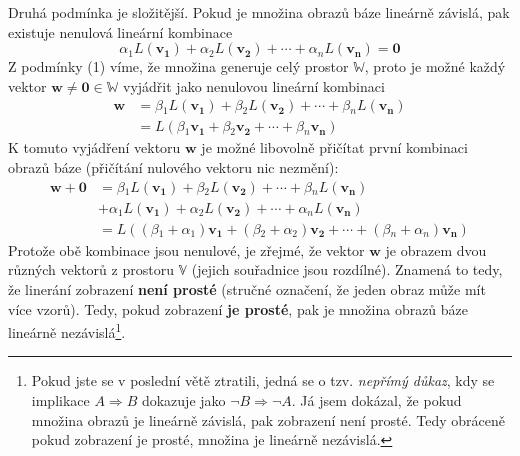 \documentclass[a5paper,12pt]{amsbook}
\theoremstyle{definition}
\newcommand{\myscalar}[1]{#1}
\newcommand{\myvec}[1]{\mathbf{#1}}
\newcommand{\myspace}[1]{\mathbb{#1}}
\newcommand{\mymap}[1]{#1}
\begin{document}
Druhá podmínka je složitější. Pokud je množina obrazů báze lineárně závislá, pak existuje
nenulová lineární kombinace
\begin{equation*}
\myscalar{\alpha{}_1}\mymap{L}(\myvec{v_1}) + \myscalar{\alpha{}_2}\mymap{L}(\myvec{v_2}) 
  + \cdots + \myscalar{\alpha{}_n}\mymap{L}(\myvec{v_n}) = \myvec{0}
\end{equation*}
 Z podmínky (1) víme, že množina generuje celý prostor $\myspace{W}$, proto je
možné každý vektor $\myvec{w}\neq\myvec{0}\in\myspace{W}$ vyjádřit jako nenulovou lineární kombinaci
\begin{equation*}
\begin{split}
\myvec{w} &= \myscalar{\beta{}_1}\mymap{L}(\myvec{v_1}) + \myscalar{\beta{}_2}\mymap{L}(\myvec{v_2}) 
  + \cdots + \myscalar{\beta{}_n}\mymap{L}(\myvec{v_n}) \\
&= \mymap{L}(\myscalar{\beta{}_1}\myvec{v_1} + \myscalar{\beta{}_2}\myvec{v_2} 
  + \cdots + \myscalar{\beta{}_n}\myvec{v_n})
\end{split}
\end{equation*}
K tomuto vyjádření vektoru $\myvec{w}$ je možné libovolně přičítat první kombinaci obrazů báze
(přičítání nulového vektoru nic nezmění):
\begin{equation*}
\begin{split}
\myvec{w} + \myvec{0} &= \myscalar{\beta{}_1}\mymap{L}(\myvec{v_1}) 
  + \myscalar{\beta{}_2}\mymap{L}(\myvec{v_2}) + \cdots + \myscalar{\beta{}_n}\mymap{L}(\myvec{v_n}) \\
  &+ \myscalar{\alpha{}_1}\mymap{L}(\myvec{v_1}) + \myscalar{\alpha{}_2}\mymap{L}(\myvec{v_2}) 
  + \cdots + \myscalar{\alpha{}_n}\mymap{L}(\myvec{v_n}) \\
&= \mymap{L}((\myscalar{\beta{}_1} + \myscalar{\alpha{}_1})\myvec{v_1} 
  + (\myscalar{\beta{}_2} + \myscalar{\alpha{}_2})\myvec{v_2} 
  + \cdots + (\myscalar{\beta{}_n} + \myscalar{\alpha{}_n})\myvec{v_n})
\end{split}
\end{equation*}
Protože obě kombinace jsou nenulové, je zřejmé, že vektor $\myvec{w}$ je obrazem dvou různých
vektorů z prostoru $\myspace{V}$ (jejich souřadnice jsou rozdílné). Znamená to tedy, že
linerání zobrazení \textbf{není prosté} (stručné označení, že jeden obraz může mít více vzorů).
Tedy, pokud zobrazení \textbf{je prosté}, pak je množina obrazů báze lineárně nezávislá\footnote{
  Pokud jste se v poslední větě ztratili, jedná se o tzv. \textit{nepřímý důkaz}, kdy se
  implikace $A\Rightarrow B$ dokazuje jako $\lnot B\Rightarrow\lnot A$. Já jsem dokázal, že pokud
  množina obrazů je lineárně závislá, pak zobrazení není prosté. Tedy obráceně pokud zobrazení
  je prosté, množina je lineárně nezávislá.
}.
\end{document}
